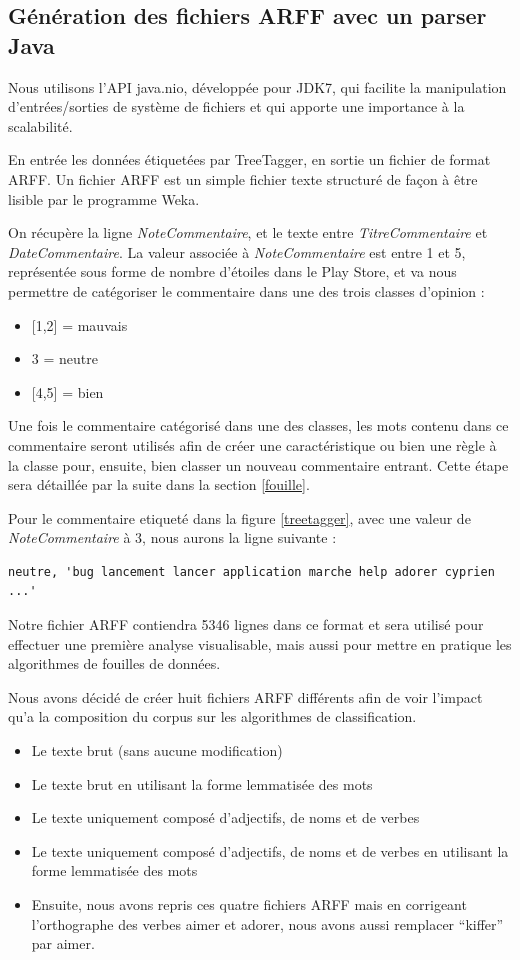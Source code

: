 \documentclass[a4paper, 11pt]{article}
\begin{document}
\subsection{Génération des fichiers ARFF avec un parser Java}
 
Nous utilisons l'API java.nio, développée pour JDK7, qui facilite la manipulation d'entrées/sorties de système de fichiers et qui apporte une importance à la scalabilité.
 
En entrée les données étiquetées par TreeTagger, en sortie un fichier de format ARFF. Un fichier ARFF est un simple fichier texte structuré de façon à être lisible par le programme Weka.

On récupère la ligne \textit{NoteCommentaire}, et le texte entre \textit{TitreCommentaire} et \textit{DateCommentaire}. La valeur associée à \textit{NoteCommentaire} est entre 1 et 5, représentée sous forme de nombre d'étoiles dans le Play Store, et va nous permettre de catégoriser le commentaire dans une des trois classes d'opinion :
\begin{itemize}
        \item{[1,2]} = mauvais
   \item{3} = neutre
   \item{[4,5]} = bien
\end{itemize}
Une fois le commentaire catégorisé dans une des classes, les mots contenu dans ce commentaire seront utilisés afin de créer une caractéristique ou bien une règle à la classe pour, ensuite, bien classer un nouveau commentaire entrant. Cette étape sera détaillée par la suite dans la section \ref{fouille}.
 
 
Pour le commentaire etiqueté dans la figure \ref{treetagger}, avec une valeur de \textit{NoteCommentaire} à 3, nous aurons la ligne suivante :
\begin{verbatim}
neutre, 'bug lancement lancer application marche help adorer cyprien ...'
\end{verbatim}
 
Notre fichier ARFF contiendra 5346 lignes dans ce format et sera utilisé pour effectuer une première analyse visualisable, mais aussi pour mettre en pratique les algorithmes de fouilles de données.

Nous avons décidé de créer huit fichiers ARFF différents afin de voir l'impact qu'a la composition du corpus sur les algorithmes de classification.

\begin{itemize}
 \item Le texte brut (sans aucune modification)
 \item Le texte brut en utilisant la forme lemmatisée des mots
 \item Le texte uniquement composé d'adjectifs, de noms et de verbes
 \item Le texte uniquement composé d'adjectifs, de noms et de verbes en utilisant la forme lemmatisée des mots
 \vspace{0.5cm}
 \item Ensuite, nous avons repris ces quatre fichiers ARFF mais en corrigeant l'orthographe des verbes aimer et adorer, nous avons aussi remplacer ``kiffer'' par aimer.
\end{itemize}
\end{document}
